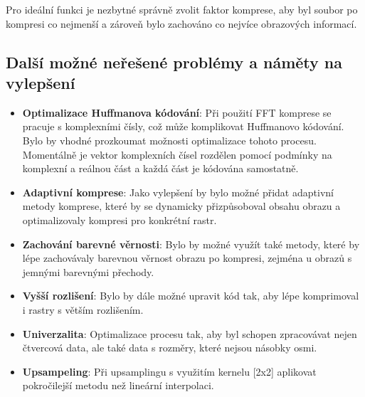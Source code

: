 Pro ideální funkci je nezbytné správně zvolit faktor komprese, aby byl soubor po kompresi co nejmenší a zároveň bylo zachováno co nejvíce obrazových informací.

\subsection*{Další možné neřešené problémy a náměty na vylepšení}

\begin{itemize}
    \item \textbf{Optimalizace Huffmanova kódování}: Při použití FFT komprese se pracuje s komplexními čísly, což může komplikovat Huffmanovo kódování. Bylo by vhodné prozkoumat možnosti optimalizace tohoto procesu. Momentálně je vektor komplexních čísel rozdělen pomocí podmínky na komplexní a reálnou část a každá část je kódována samostatně.
    \item \textbf{Adaptivní komprese}: Jako vylepšení by bylo možné přidat adaptivní metody komprese, které by se dynamicky přizpůsoboval obsahu obrazu a optimalizovaly kompresi pro konkrétní rastr.
    \item \textbf{Zachování barevné věrnosti}: Bylo by možné využít také metody, které by lépe zachovávaly barevnou věrnost obrazu po kompresi, zejména u obrazů s jemnými barevnými přechody.
    \item \textbf{Vyšší rozlišení}: Bylo by dále možné upravit kód tak, aby lépe komprimoval i rastry s větším rozlišením.
    \item \textbf{Univerzalita}: Optimalizace procesu tak, aby byl schopen zpracovávat nejen čtvercová data, ale také data s rozměry, které nejsou násobky osmi.
    \item \textbf{Upsampeling}: Při upsamplingu s využitím kernelu [2x2] aplikovat pokročilejší metodu než lineární interpolaci.
\end{itemize}
